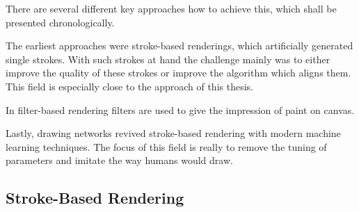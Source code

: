 There are several different key approaches how to achieve this, which shall be presented chronologically.

The earliest approaches were stroke-based renderings, which artificially generated single strokes.
With such strokes at hand the challenge mainly was to either improve the quality of these strokes or improve the algorithm which aligns them.
This field is especially close to the approach of this thesis.

In filter-based rendering filters are used to give the impression of \ie paint on canvas.

Lastly, drawing networks revived stroke-based rendering with modern machine learning techniques.
The focus of this field is really to remove the tuning of parameters and imitate the way humans would draw.
%
%



\subsection{Stroke-Based Rendering}



